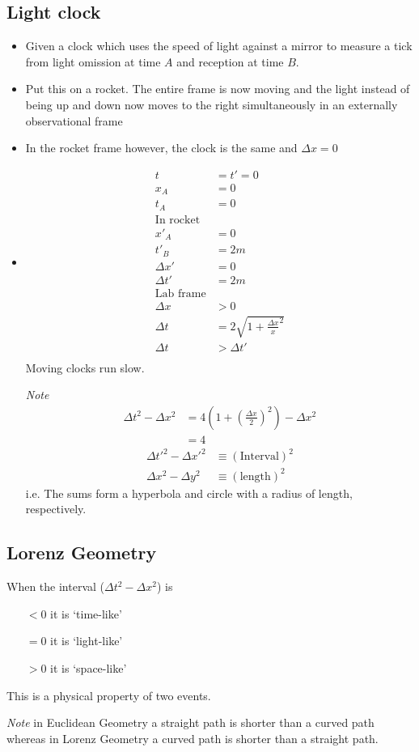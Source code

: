 \documentclass[12pt,letterpaper, twocolumn]{article}
\begin{document}
\subsection{Light clock}
\begin{itemize}
    \item Given a clock which uses the speed of light against a mirror to measure a tick from light omission at time $A$ and reception at time $B$. 
    \item Put this on a rocket. The entire frame is now moving and the light instead of being up and down now moves to the right simultaneously in an externally observational frame
    \item In the rocket frame however, the clock is the same and $\Delta x=0$
    \item \begin{align*}
        t&=t'=0\\
        x_A&=0\\
        t_A&=0\\
        \text{In rocket}\\
        x'_A&=0\\
        t'_B&=2m\\
        \Delta x'&=0\\
        \Delta t'&=2m\\
        \text{Lab frame}\\
        \Delta x &> 0\\
        \Delta t &= 2\sqrt{1+\frac{\Delta x}{x}^2}\\
        \Delta t &> \Delta t'\\ 
    \end{align*}
    Moving clocks run slow. 

    \textit{Note} \begin{align*}
        \Delta t^2-\Delta x^2 &= 4(1+(\frac{\Delta x}{2})^2)-\Delta x^2\\
        &= 4
    \end{align*}
    \begin{align*}
        \Delta t'^2-\Delta x'^2&\equiv (\text{Interval})^2\\
        \Delta x^2-\Delta y^2&\equiv (\text{length})^2
    \end{align*}
    i.e. The sums form a hyperbola and  circle with a radius of length, respectively. 
\end{itemize}

\vfill\null
\subsection*{Lorenz Geometry}
When the interval ($\Delta t^2 - \Delta x^2$) is 
\begin{itemize}
    \item[$< 0$] it is `time-like'
    \item[$= 0$] it is `light-like'
    \item[$> 0$] it is `space-like'
\end{itemize}
This is a physical property of two events.

\textit{Note} in Euclidean Geometry a straight path is shorter than a curved path whereas in Lorenz Geometry a curved path is shorter than a straight path.
\end{document}
